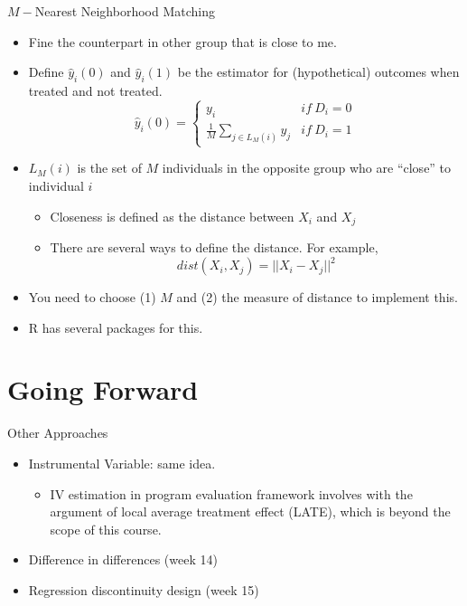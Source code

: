 \documentclass[
  ignorenonframetext,
]{beamer}
\providecommand{\tightlist}{%
  \setlength{\itemsep}{0pt}\setlength{\parskip}{0pt}}
\begin{document}
\begin{frame}{\(M-\)Nearest Neighborhood Matching}
\protect\hypertarget{m-nearest-neighborhood-matching}{}
\begin{itemize}
\item
  Fine the counterpart in other group that is close to me.
\item
  Define \(\hat{y}_{i}(0)\) and \(\hat{y}_{i}(1)\) be the estimator for
  (hypothetical) outcomes when treated and not treated.
  \[\hat{y}_{i}(0)=\begin{cases}
  y_{i} & if\ D_{i}=0\\
  \frac{1}{M}\sum_{j\in L_{M}(i)}y_{j} & if\ D_{i}=1
  \end{cases}\]
\item
  \(L_{M}(i)\) is the set of \(M\) individuals in the opposite group who
  are ``close'' to individual \(i\)

  \begin{itemize}
  \item
    Closeness is defined as the distance between \(X_{i}\) and \(X_{j}\)
  \item
    There are several ways to define the distance. For example,
    \[dist(X_{i},X_{j})=||X_{i}-X_{j}||^{2}\]
  \end{itemize}
\item
  You need to choose (1) \(M\) and (2) the measure of distance to
  implement this.
\item
  R has several packages for this.
\end{itemize}
\end{frame}

\hypertarget{going-forward}{%
\section{Going Forward}\label{going-forward}}

\begin{frame}{Other Approaches}
\protect\hypertarget{other-approaches}{}
\begin{itemize}
\item
  Instrumental Variable: same idea.

  \begin{itemize}
  \tightlist
  \item
    IV estimation in program evaluation framework involves with the
    argument of local average treatment effect (LATE), which is beyond
    the scope of this course.
  \end{itemize}
\item
  Difference in differences (week 14)
\item
  Regression discontinuity design (week 15)
\end{itemize}
\end{frame}
\end{document}
